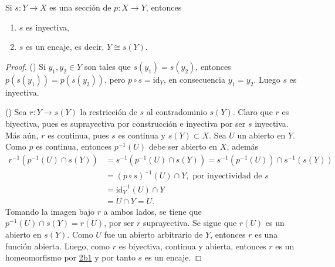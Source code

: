 
\begin{theorem}
Si $s : Y \longrightarrow X$ es una sección de $p : X \longrightarrow Y$, entonces
\begin{enumerate}[label=\textnormal{(\roman*)}]
\item $s$ es inyectiva,
\item $s$ es un encaje, es decir, $Y \cong s(Y)$.
\end{enumerate}
\end{theorem}

\begin{proof}
({}) Si $y_1, y_2 \in Y$ son tales que $s(y_1) = s(y_2)$, entonces $p(s(y_1)) = p(s(y_2))$, pero $p \circ s = \text{id}_Y$, en consecuencia $y_1 = y_2$. Luego $s$ es inyectiva.
\bigskip

({}) Sea $r : Y \longrightarrow s(Y)$ la restricción de $s$ al contradominio $s(Y)$. Claro que $r$ es biyectiva, pues es suprayectiva por construcción e inyectiva por ser $s$ inyectiva. Más aún, $r$ es continua, pues $s$ es continua y $s(Y) \subset X$. Sea $U$ un abierto en $Y$. Como $p$ es continua, entonces $p^{-1}(U)$ debe ser abierto en $X$, además
\begin{align*}
    r^{-1}(p^{-1}(U) \cap s(Y)) &= s^{-1}(p^{-1}(U) \cap s(Y)) = s^{-1}(p^{-1}(U)) \cap s^{-1}(s(Y)) \\
                                &= (p \circ s)^{-1}(U) \cap Y, \text{ por inyectividad de } s \\
                                &= \text{id}^{-1}_Y(U) \cap Y \\
                                &= U \cap Y = U.
\end{align*}
Tomando la imagen bajo $r$ a ambos lados, se tiene que $p^{-1}(U) \cap s(Y) = r(U)$, por ser $r$ suprayectiva. Se sigue que $r(U)$ es un abierto en $s(Y)$. Como $U$ fue un abierto arbitrario de $Y$, entonces $r$ es una función abierta. Luego, como $r$ es biyectiva, continua y abierta, entonces $r$ es un homeomorfismo por \hyperref[card:2b1]{\textsf{2b1}} y por tanto $s$ es un encaje.
\end{proof}
